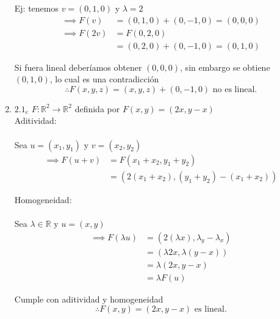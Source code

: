 \documentclass{article}
\begin{document}
\begin{enumerate}
			Ej: tenemos \(v=(0,1,0)\) y \(\lambda =2\)
			\begin{equation*}
				\begin{aligned}
					\implies F(v) &=(0,1,0)+(0,-1,0)=(0,0,0)\\
					\implies F(2v) &=F(0,2,0)\\ 
									&=(0,2,0)+(0,-1,0)=(0,1,0)
				\end{aligned}
			\end{equation*}
			
			Si fuera lineal deberíamos obtener \((0,0,0)\), sin embargo se obtiene \((0,1,0)\), lo cual es una contradicción
			\begin{equation*}
				\boxed{ \therefore F(x,y,z)=(x,y,z)+(0,-1,0)} \text{ no es lineal.}
			\end{equation*}
			
			
			\item \(2.1_e\) 
			\(F: \mathbb{R}^2 \to \mathbb{R}^2\) definida por \(F(x,y)=(2x,y-x)\)\\
			
			Aditividad:\\
			\\Sea \(u=(x_1,y_1)\) y \(v=(x_2,y_2)\)
			\begin{equation*}
				\begin{aligned}
					\implies F(u+v) &=F(x_1+x_2,y_1+y_2)\\
									&=(2(x_1+x_2),(y_1+y_2)-(x_1+x_2))
				\end{aligned}
			\end{equation*}
			
			Homogeneidad:\\
			\\Sea \(\lambda \in \mathbb{R}\) y \(u=(x,y)\)
			\begin{equation*}
				\begin{aligned}
					\implies F(\lambda u) &=(2(\lambda x),\lambda_y-\lambda_x)\\
										  &=(\lambda 2x, \lambda (y-x))\\
										  &=\lambda (2x,y-x)\\
										  &=\lambda F(u)
				\end{aligned}
			\end{equation*}
			
			Cumple con aditividad y homogeneidad
			\begin{equation*}
				\boxed{\therefore F(x,y)=(2x,y-x)} \text{ es lineal.}
			\end{equation*}
			
		\end{enumerate}
		
\end{document}

